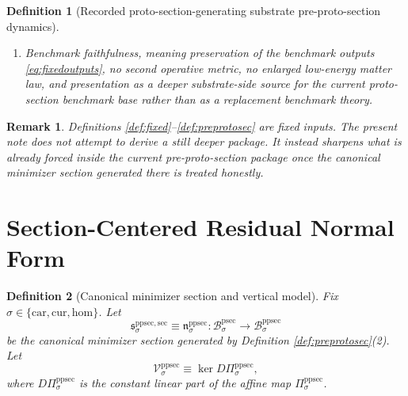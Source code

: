 \documentclass[11pt]{article}
\newcommand{\Car}{\mathrm{car}}
\newcommand{\Cur}{\mathrm{cur}}
\newcommand{\Hom}{\mathrm{hom}}
\newcommand{\ProtoSectionBody}[1]{\mathcal B_{#1}^{\mathrm{psec}}}
\newcommand{\ProtoSectionShell}[1]{\mathcal Z_{#1}^{\mathrm{psec}}}
\newcommand{\PreProtoSectionBody}[1]{\mathcal B_{#1}^{\mathrm{ppsec}}}
\newcommand{\PreProtoSectionProj}[1]{\Pi_{#1}^{\mathrm{ppsec}}}
\newcommand{\PreProtoSectionFiber}[2]{\mathcal F_{#1}^{\mathrm{ppsec}}(#2)}
\newcommand{\PreProtoSectionProtoMin}[1]{\mathfrak n_{#1}^{\mathrm{ppsec}}}
\newcommand{\PreProtoSectionFunctional}[1]{\mathscr F_{#1}^{\mathrm{ppsec}}}
\newcommand{\PreProtoSectionShell}[1]{\mathcal Z_{#1}^{\mathrm{ppsec}}}
\newcommand{\PreProtoSectionMinSection}[1]{\mathfrak s_{#1}^{\mathrm{ppsec,sec}}}
\newcommand{\PreProtoSectionVertical}[1]{\mathcal V_{#1}^{\mathrm{ppsec}}}
\newtheorem{definition}{Definition}
\newtheorem{remark}{Remark}
\begin{document}
\begin{definition}[Recorded proto-section-generating substrate pre-proto-section dynamics]
\begin{enumerate}
\[    \begin{array}{l}
    \PreProtoSectionProj{\sigma}(u)\in\ProtoSectionShell{\sigma},\\[0.2em]
    \PreProtoSectionFunctional{\sigma}(u)
    =
    \displaystyle\min_{v\in\PreProtoSectionFiber{\sigma}{\PreProtoSectionProj{\sigma}(u)}}
    \PreProtoSectionFunctional{\sigma}(v)
    \end{array}
    \right\},
    \]
    and
    \[
    \PreProtoSectionProj{\sigma}\big|_{\PreProtoSectionShell{\sigma}}
    :
    \PreProtoSectionShell{\sigma}
    \xrightarrow{\cong}
    \ProtoSectionShell{\sigma}
    \]
    is a diffeomorphism.
    \item Benchmark faithfulness, meaning preservation of the benchmark outputs \eqref{eq:fixedoutputs}, no second operative metric, no enlarged low-energy matter law, and presentation as a deeper substrate-side source for the current proto-section benchmark base rather than as a replacement benchmark theory.
\end{enumerate}
\end{definition}

\begin{remark}
Definitions \ref{def:fixed}--\ref{def:preprotosec} are fixed inputs. The present note does not attempt to derive a still deeper package. It instead sharpens what is already forced inside the current pre-proto-section package once the canonical minimizer section generated there is treated honestly.
\end{remark}

\section{Section-Centered Residual Normal Form}

\begin{definition}[Canonical minimizer section and vertical model]
\label{def:vertical}
Fix \(\sigma\in\{\Car,\Cur,\Hom\}\). Let
\[
\PreProtoSectionMinSection{\sigma}
\equiv
\PreProtoSectionProtoMin{\sigma}
:
\ProtoSectionBody{\sigma}\to\PreProtoSectionBody{\sigma}
\]
be the canonical minimizer section generated by Definition \ref{def:preprotosec}(2). Let
\[
\PreProtoSectionVertical{\sigma}
\equiv
\ker D\PreProtoSectionProj{\sigma},
\]
where \(D\PreProtoSectionProj{\sigma}\) is the constant linear part of the affine map \(\PreProtoSectionProj{\sigma}\).
\end{definition}
\end{document}
